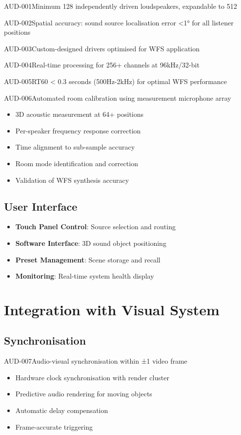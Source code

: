 \begin{requirement}{AUD-001}{Minimum 128 independently driven loudspeakers, expandable to 512}
\begin{requirement}{AUD-002}{Spatial accuracy: sound source localisation error <1° for all listener positions}
\begin{requirement}{AUD-003}{Custom-designed drivers optimised for WFS application}
\begin{requirement}{AUD-004}{Real-time processing for 256+ channels at 96kHz/32-bit}
\begin{requirement}{AUD-005}{RT60 < 0.3 seconds (500Hz-2kHz) for optimal WFS performance}
\begin{requirement}{AUD-006}{Automated room calibration using measurement microphone array}
\begin{itemize}
    \item 3D acoustic measurement at 64+ positions
    \item Per-speaker frequency response correction
    \item Time alignment to sub-sample accuracy
    \item Room mode identification and correction
    \item Validation of WFS synthesis accuracy
\end{itemize}

\subsection{User Interface}

\begin{itemize}
    \item \textbf{Touch Panel Control}: Source selection and routing
    \item \textbf{Software Interface}: 3D sound object positioning
    \item \textbf{Preset Management}: Scene storage and recall
    \item \textbf{Monitoring}: Real-time system health display
\end{itemize}

\section{Integration with Visual System}

\subsection{Synchronisation}

\begin{requirement}{AUD-007}{Audio-visual synchronisation within ±1 video frame}

\begin{itemize}
    \item Hardware clock synchronisation with render cluster
    \item Predictive audio rendering for moving objects
    \item Automatic delay compensation
    \item Frame-accurate triggering
\end{itemize}


\end{requirement}
\end{requirement}
\end{requirement}
\end{requirement}
\end{requirement}
\end{requirement}
\end{requirement}

